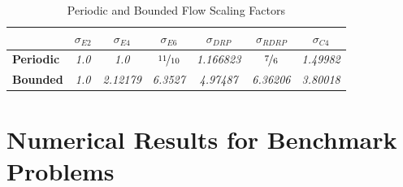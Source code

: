 \documentclass[conf]{new-aiaa}
\begin{document}

\begin{table}[htp!]
\centering
\caption{Periodic and Bounded Flow Scaling Factors}
\begin{tabular}{|l|c|c|c|c|c|c|}
\hline
 & \multicolumn{1}{c|}{\textbf{$\sigma_{E2}$}} & \multicolumn{1}{c|}{\textbf{$\sigma_{E4}$}} & \multicolumn{1}{c|}{$\sigma_{E6}$} & \multicolumn{1}{c|}{$\sigma_{DRP}$} & \multicolumn{1}{c|}{$\sigma_{RDRP}$}& \multicolumn{1}{c|}{$\sigma_{C4}$}\\ \hline
\textbf{Periodic} & \textit{1.0} & \textit{1.0} & \textit{$\nicefrac{11}{10}$} & \textit{1.166823} & \textit{$\nicefrac{7}{6}$} & \textit{1.49982}\\ \hline
\textbf{Bounded} & \textit{1.0} & \textit{2.12179} & \textit{6.3527} & 
	\textit{4.97487} & 
	\textit{6.36206}& 
	\textit{3.80018}\\ \hline
\end{tabular}
\label{tab:Scaling}
\end{table}
\pagebreak
\section{Numerical Results for Benchmark
Problems}
\end{document}
